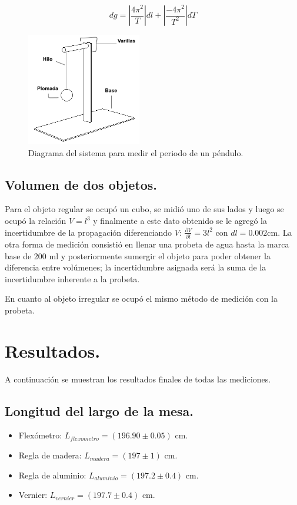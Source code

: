 \documentclass{article}
\begin{document}
$$ dg = \left| \frac{4\pi^2}{T}\right| dl + \left| \frac{-4\pi^2}{T^2}\right| dT $$

\begin{figure}[H]
    \centering
    \includegraphics[width=5cm]{pendulo.png}%
    \caption{Diagrama del sistema para medir el periodo de un péndulo.}%
\end{figure}


\subsection{Volumen de dos objetos.}
 Para el objeto regular se ocupó un cubo, se midió uno de sus lados y luego se ocupó la relación $V = l^3$ y finalmente a este dato obtenido se le agregó la incertidumbre de la propagación diferenciando $V$: $\frac{\partial V}{\partial l} = 3l^2$ con $dl = 0.002$cm. La otra forma de medición consistió en llenar una probeta de agua hasta la marca base de 200 ml y posteriormente sumergir el objeto para poder obtener la diferencia entre volúmenes; la incertidumbre asignada será la suma de la incertidumbre inherente a la probeta.

En cuanto al objeto irregular se ocupó el mismo método de medición con la probeta.











\section{Resultados.}
A continuación se muestran los resultados finales de todas las mediciones.

\subsection{Longitud del largo de la mesa.}
\begin{itemize}
  \item Flexómetro: $ L_{flexometro} =  ( 196.90 \pm 0.05 )$ cm.
  \item Regla de madera: $ L_{madera} = ( 197 \pm 1 )$ cm.
  \item Regla de aluminio: $ L_{aluminio} = ( 197.2 \pm 0.4 )$ cm.
  \item Vernier: $ L_{vernier} = ( 197.7 \pm 0.4 ) $ cm.
\end{itemize}
\end{document}
